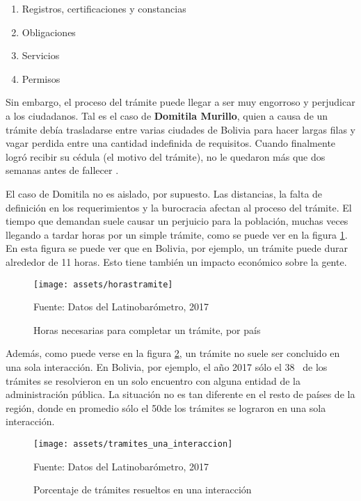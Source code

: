 \begin{enumerate}
    \item Registros, certificaciones y constancias
    \item Obligaciones
    \item Servicios
    \item Permisos
\end{enumerate}

Sin embargo, el proceso del trámite puede llegar a ser muy engorroso y perjudicar a los ciudadanos.
Tal es el caso de \textbf{Domitila Murillo}, quien a causa de un trámite debía trasladarse entre varias ciudades de Bolivia para hacer largas filas y vagar perdida entre una cantidad indefinida de requisitos. 
Cuando finalmente logró recibir su cédula (el motivo del trámite), no le quedaron más que dos semanas antes de fallecer \cite{charoskyQuejaComoEnergia2014}.

El caso de Domitila no es aislado, por supuesto. 
Las distancias, la falta de definición en los requerimientos y la burocracia afectan al proceso del trámite. 
El tiempo que demandan suele causar un perjuicio para la población, muchas veces llegando a tardar horas por un simple trámite, como se puede ver en la figura \ref{fig:horastramite}.
En esta figura se puede ver que en Bolivia, por ejemplo, un trámite puede durar alrededor de 11 horas. Esto tiene también un impacto económico sobre la gente. 

\begin{figure}[htbp]
    \centering
    \texttt{[image: assets/horastramite]}
    \caption{Horas necesarias para completar un trámite, por país}{Fuente: Datos del Latinobarómetro, 2017}
    \label{fig:horastramite}
\end{figure}

Además, como puede verse en la figura \ref{fig:tramites_una_interaccion}, un trámite no suele ser concluido en una sola interacción. 
En Bolivia, por ejemplo, el año 2017 sólo el 38\percentsign ~ de los trámites se resolvieron en un solo encuentro con alguna entidad de la administración pública. 
La situación no es tan diferente en el resto de países de la región, donde en promedio sólo el 50\percentsign de los trámites se lograron en una sola interacción.

\begin{figure}
    \centering
    \texttt{[image: assets/tramites\_una\_interaccion]}
    \caption{Porcentaje de trámites resueltos en una interacción}{Fuente: Datos del Latinobarómetro, 2017}
    \label{fig:tramites_una_interaccion}
\end{figure}

